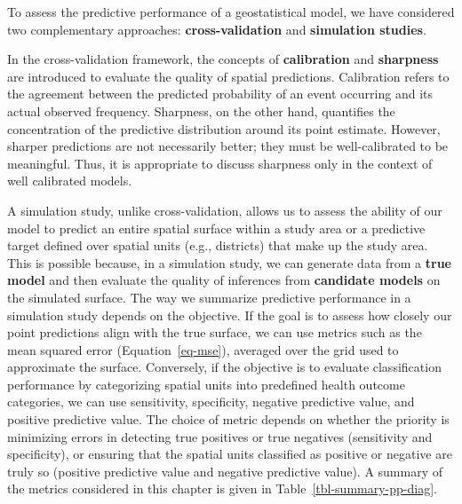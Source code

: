 \documentclass[
  letterpaper,
]{krantz}
\begin{document}
To assess the predictive performance of a geostatistical model, we have
considered two complementary approaches: \textbf{cross-validation} and
\textbf{simulation studies}.

In the cross-validation framework, the concepts of \textbf{calibration}
and \textbf{sharpness} are introduced to evaluate the quality of spatial
predictions. Calibration refers to the agreement between the predicted
probability of an event occurring and its actual observed frequency.
Sharpness, on the other hand, quantifies the concentration of the
predictive distribution around its point estimate. However, sharper
predictions are not necessarily better; they must be well-calibrated to
be meaningful. Thus, it is appropriate to discuss sharpness only in the
context of well calibrated models.

A simulation study, unlike cross-validation, allows us to assess the
ability of our model to predict an entire spatial surface within a study
area or a predictive target defined over spatial units (e.g., districts)
that make up the study area. This is possible because, in a simulation
study, we can generate data from a \textbf{true model} and then evaluate
the quality of inferences from \textbf{candidate models} on the
simulated surface. The way we summarize predictive performance in a
simulation study depends on the objective. If the goal is to assess how
closely our point predictions align with the true surface, we can use
metrics such as the mean squared error (Equation~\ref{eq-mse}), averaged
over the grid used to approximate the surface. Conversely, if the
objective is to evaluate classification performance by categorizing
spatial units into predefined health outcome categories, we can use
sensitivity, specificity, negative predictive value, and positive
predictive value. The choice of metric depends on whether the priority
is minimizing errors in detecting true positives or true negatives
(sensitivity and specificity), or ensuring that the spatial units
classified as positive or negative are truly so (positive predictive
value and negative predictive value). A summary of the metrics
considered in this chapter is given in Table~\ref{tbl-summary-pp-diag}.
\end{document}
